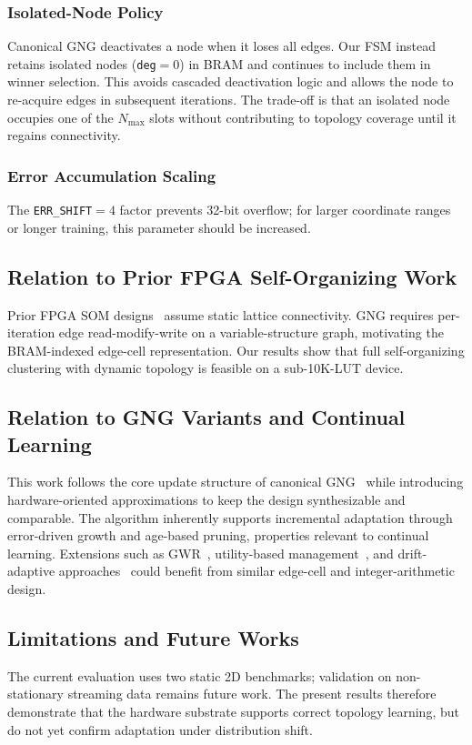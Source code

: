 \documentclass[conference]{IEEEtran}
\begin{document}
\subsubsection{Isolated-Node Policy}
Canonical GNG deactivates a node when it loses all edges. Our FSM instead retains isolated nodes (\texttt{deg}$=0$) in BRAM and continues to include them in winner selection. This avoids cascaded deactivation logic and allows the node to re-acquire edges in subsequent iterations. The trade-off is that an isolated node occupies one of the $N_{\max}$ slots without contributing to topology coverage until it regains connectivity.

\subsubsection{Error Accumulation Scaling}
The \texttt{ERR\_SHIFT}$=4$ factor prevents 32-bit overflow; for larger coordinate ranges or longer training, this parameter should be increased.

\subsection{Relation to Prior FPGA Self-Organizing Work}
Prior FPGA SOM designs~\cite{coelho2020fpga,Dias2021SOMFPGA} assume static lattice connectivity. GNG requires per-iteration edge read-modify-write on a variable-structure graph, motivating the BRAM-indexed edge-cell representation. Our results show that full self-organizing clustering with dynamic topology is feasible on a sub-10K-LUT device.

\subsection{Relation to GNG Variants and Continual Learning}
This work follows the core update structure of canonical GNG~\cite{fritzke1994growing} while introducing hardware-oriented approximations to keep the design synthesizable and comparable. The algorithm inherently supports incremental adaptation through error-driven growth and age-based pruning, properties relevant to continual learning. Extensions such as GWR~\cite{marsland2002self}, utility-based management~\cite{Holmstrom2002Utility}, and drift-adaptive approaches~\cite{Arostegi2025AiGAS} could benefit from similar edge-cell and integer-arithmetic design.

\subsection{Limitations and Future Works}
The current evaluation uses two static 2D benchmarks; validation on non-stationary streaming data remains future work. The present results therefore demonstrate that the hardware substrate supports correct topology learning, but do not yet confirm adaptation under distribution shift.
\end{document}

